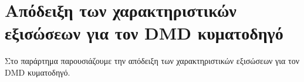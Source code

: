 
\begin{appendix}\label{appendix:A}

\cleardoublepage
{}

\chapter{Απόδειξη των χαρακτηριστικών εξισώσεων για τον DMD κυματοδηγό}
Στο παράρτημα παρουσιάζουμε την απόδειξη των χαρακτηριστικών εξισώσεων για τον DMD κυματοδηγό.





       
\end{appendix}


\newpage
\cleardoublepage